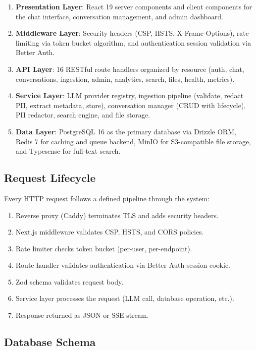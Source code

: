 \documentclass[conference]{IEEEtran}
\begin{document}
\begin{enumerate}
  \item \textbf{Presentation Layer}: React 19 server components and client components for the chat interface, conversation management, and admin dashboard.
  \item \textbf{Middleware Layer}: Security headers (CSP, HSTS, X-Frame-Options), rate limiting via token bucket algorithm, and authentication session validation via Better Auth.
  \item \textbf{API Layer}: 16 RESTful route handlers organized by resource (auth, chat, conversations, ingestion, admin, analytics, search, files, health, metrics).
  \item \textbf{Service Layer}: LLM provider registry, ingestion pipeline (validate, redact PII, extract metadata, store), conversation manager (CRUD with lifecycle), PII redactor, search engine, and file storage.
  \item \textbf{Data Layer}: PostgreSQL 16 as the primary database via Drizzle ORM, Redis 7 for caching and queue backend, MinIO for S3-compatible file storage, and Typesense for full-text search.
\end{enumerate}

\subsection{Request Lifecycle}

Every HTTP request follows a defined pipeline through the system:

\begin{enumerate}
  \item Reverse proxy (Caddy) terminates TLS and adds security headers.
  \item Next.js middleware validates CSP, HSTS, and CORS policies.
  \item Rate limiter checks token bucket (per-user, per-endpoint).
  \item Route handler validates authentication via Better Auth session cookie.
  \item Zod schema validates request body.
  \item Service layer processes the request (LLM call, database operation, etc.).
  \item Response returned as JSON or SSE stream.
\end{enumerate}

\subsection{Database Schema}
\end{document}
